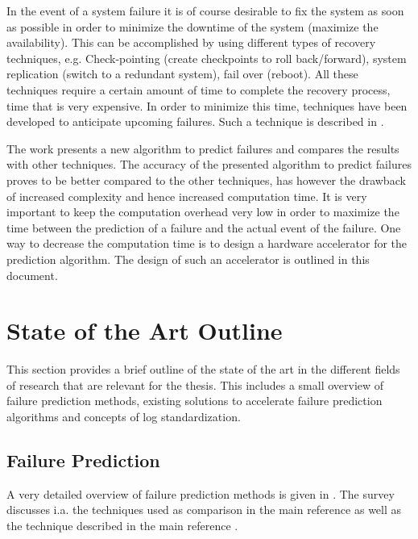\documentclass[12pt]{article} %
\begin{document}
In the event of a system failure it is of course desirable to fix the system as
soon as possible in order to minimize the downtime of the system (maximize the
availability). This can be accomplished by using different types of recovery
techniques, e.g. Check-pointing (create checkpoints to roll back/forward),
system replication (switch to a redundant system), fail over (reboot). All these
techniques require a certain amount of time to complete the recovery process,
time that is very expensive. In order to minimize this time, techniques have
been developed to anticipate upcoming failures. Such a technique is described in
\cite{salfner08}.

The work presents a new algorithm to predict failures and compares the results
with other techniques. The accuracy of the presented algorithm to predict
failures proves to be better compared to the other techniques, has however the
drawback of increased complexity and hence increased computation time. It is
very important to keep the computation overhead very low in order to maximize
the time between the prediction of a failure and the actual event of the
failure. One way to decrease the computation time is to design a hardware
accelerator for the prediction algorithm. The design of such an accelerator is
outlined in this document.


\section{State of the Art Outline} %

This section provides a brief outline of the state of the art in the different
fields of research that are relevant for the thesis. This includes a small
overview of failure prediction methods, existing solutions to accelerate
failure prediction algorithms and concepts of log standardization.


\subsection{Failure Prediction} %

A very detailed overview of failure prediction methods is given in
\cite{ACM10_Salfner}. The survey discusses i.a. the techniques used as
comparison in the main reference
\cite{lin88,IEEE90_lin,ICDM02_Vilalta,domeniconi02} as well as the technique
described in the main reference \cite{salfner08}.
\end{document}
